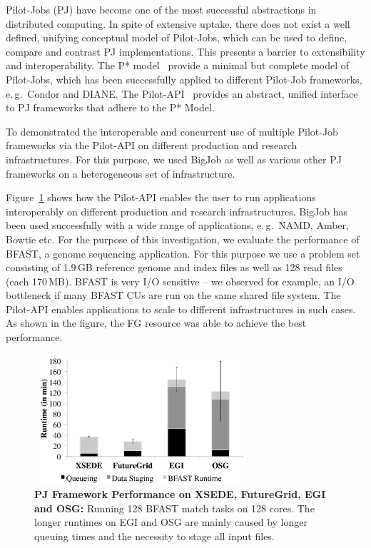 \documentclass[]{paper}
\begin{document}
Pilot-Jobs (PJ) have become one of the most successful abstractions in
distributed computing. In spite of extensive uptake, there does not
exist a well defined, unifying conceptual model of Pilot-Jobs, which
can be used to define, compare and contrast PJ implementations. This
presents a barrier to extensibility and interoperability. The P*
model~\cite{pstar-2012,pstar-sc-2012} provide a minimal but complete
model of Pilot-Jobs, which has been successfully applied to different
Pilot-Job frameworks, e.\,g.\ Condor and DIANE. The
Pilot-API~\cite{pilot_api} provides an abstract, unified interface to
PJ frameworks that adhere to the P* Model.


To demonstrated the interoperable and concurrent use of multiple Pilot-Job
frameworks via the Pilot-API on different production and research
infrastructures. For this purpose, we used BigJob as well as various other PJ 
frameworks on a heterogeneous set of infrastructure. 

Figure~\ref{fig:perf_perf-bfast-bj} shows how the Pilot-API enables the user to
run applications interoperably on different production and research
infrastructures. BigJob has been used successfully with a wide range of
applications, e.\,g.\ NAMD, Amber, Bowtie etc. For the purpose of this
investigation, we evaluate the performance of BFAST, a genome sequencing
application. For this purpose we use a problem set consisting of 
1.9\,GB reference genome and index files as well as 128 read
files (each 170\,MB). BFAST is very I/O sensitive -- we observed for example, an
I/O bottleneck if many BFAST CUs are run on the same shared file system. The
Pilot-API enables applications to scale to different infrastructures in such
cases. As shown in the figure, the FG resource was able to achieve the best 
performance.


\begin{figure}[t]
\centering
\includegraphics[width=0.7\textwidth]{figures/128-bfast-egi-fg-xsede-osg.pdf}
\caption{\textbf{PJ Framework Performance on XSEDE, FutureGrid, EGI and 
  OSG:} Running 128 BFAST match tasks on 128 cores. The longer runtimes on EGI 
  and OSG are mainly caused by  longer queuing times and the necessity to      
  stage all input files.}
  \label{fig:perf_perf-bfast-bj}
\end{figure}
\end{document}
